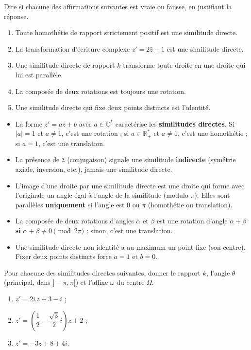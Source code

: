 \documentclass[11pt]{article}
\begin{document}
\begin{exercice}
Dire si chacune des affirmations suivantes est vraie ou fausse, en justifiant la réponse.
\begin{enumerate}
\item Toute homothétie de rapport strictement positif est une similitude directe.
\item La transformation d'écriture complexe $z' = 2\bar{z} + 1$ est une similitude directe.
\item Une similitude directe de rapport $k$ transforme toute droite en une droite qui lui est parallèle.
\item La composée de deux rotations est toujours une rotation.
\item Une similitude directe qui fixe deux points distincts est l'identité.
\end{enumerate}
\end{exercice}

\begin{attention}
\begin{itemize}
\item La forme $z' = az + b$ avec $a \in \mathbb{C}^*$ caractérise les \textbf{similitudes directes}. Si $|a|=1$ et $a \neq 1$, c'est une rotation ; si $a \in \mathbb{R}^*_+$ et $a \neq 1$, c'est une homothétie ; si $a=1$, c'est une translation.
\item La présence de $\bar{z}$ (conjugaison) signale une similitude \textbf{indirecte} (symétrie axiale, inversion, etc.), jamais une similitude directe.
\item L'image d'une droite par une similitude directe est une droite qui forme avec l'originale un angle égal à l'angle de la similitude (modulo $\pi$). Elles sont parallèles \textbf{uniquement} si l'angle est $0$ ou $\pi$ (homothétie ou translation).
\item La composée de deux rotations d'angles $\alpha$ et $\beta$ est une rotation d'angle $\alpha+\beta$ \textbf{si} $\alpha+\beta \not\equiv 0 \pmod{2\pi}$ ; sinon, c'est une translation.
\item Une similitude directe non identité a au maximum un point fixe (son centre). Fixer deux points distincts force $a=1$ et $b=0$.
\end{itemize}
\end{attention}

\begin{exercice}
Pour chacune des similitudes directes suivantes, donner le rapport $k$, l'angle $\theta$ (principal, dans $]-\pi,\pi]$) et l'affixe $\omega$ du centre $\Omega$.
\begin{enumerate}
\item $z' = 2i\,z + 3 - i$ ;
\item $z' = \left(\dfrac{1}{2} - \dfrac{\sqrt{3}}{2}i\right) z + 2$ ;
\item $z' = -3z + 8 + 4i$.
\end{enumerate}
\end{exercice}
\end{document}
